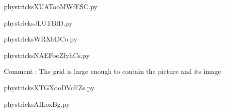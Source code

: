 
    \newcommand{\CaptionFigXUATooMWfESC}{<+Type your caption here+>}
    \begin{center}
        
    \end{center}
    phystricksXUATooMWfESC.py

    

    \clearpage
    


    \newcommand{\CaptionFigJLUTBlD}{<+Type your caption here+>}
    \begin{center}
        
    \end{center}
    phystricksJLUTBlD.py

    

    \clearpage
    


    \newcommand{\CaptionFigWRXbDCo}{<+Type your caption here+>}
    \begin{center}
        
    \end{center}
    phystricksWRXbDCo.py

    

    \clearpage
    


    \newcommand{\CaptionFigNAEFooZfyhCs}{<+Type your caption here+>}
    \begin{center}
        
    \end{center}
    phystricksNAEFooZfyhCs.py

    Comment : The grid is large enough to contain the picture and its image

    \clearpage
    


    \newcommand{\CaptionFigXTGXooDVcEZs}{<+Type your caption here+>}
    \begin{center}
        
    \end{center}
    phystricksXTGXooDVcEZs.py

    

    \clearpage
    


    \newcommand{\CaptionFigAILoxBg}{<+Type your caption here+>}
    \begin{center}
        
    \end{center}
    phystricksAILoxBg.py

